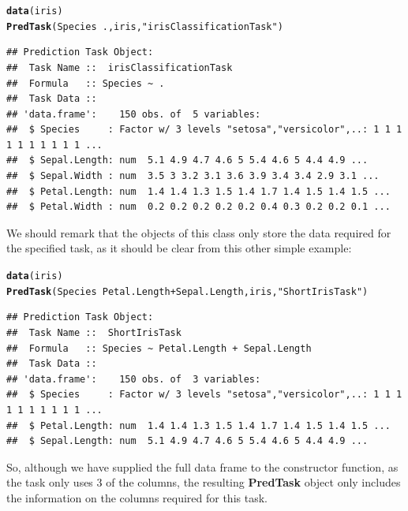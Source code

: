 \documentclass[10pt,a4paper]{article}\usepackage[]{graphicx}\usepackage[]{color}
\makeatletter
\newcommand{\hlstr}[1]{\textcolor[rgb]{0.192,0.494,0.8}{#1}}%
\newcommand{\hlopt}[1]{\textcolor[rgb]{0,0,0}{#1}}%
\newcommand{\hlstd}[1]{\textcolor[rgb]{0.345,0.345,0.345}{#1}}%
\newcommand{\hlkwd}[1]{\textcolor[rgb]{0.737,0.353,0.396}{\textbf{#1}}}%
\newenvironment{kframe}{%
 \def\at@end@of@kframe{}%
 \ifinner\ifhmode%
  \def\at@end@of@kframe{\end{minipage}}%
  \begin{minipage}{\columnwidth}%
 \fi\fi%
 \def\FrameCommand##1{\hskip\@totalleftmargin \hskip-\fboxsep
 \colorbox{shadecolor}{##1}\hskip-\fboxsep
     \hskip-\linewidth \hskip-\@totalleftmargin \hskip\columnwidth}%
 \MakeFramed {\advance\hsize-\width
   \@totalleftmargin\z@ \linewidth\hsize
   \@setminipage}}%
 {\par\unskip\endMakeFramed%
 \at@end@of@kframe}
\newenvironment{knitrout}{}{} %
\makeatother
\begin{document}
\begin{knitrout}
\color{fgcolor}\begin{kframe}
\begin{alltt}
\hlkwd{data}\hlstd{(iris)}
\hlkwd{PredTask}\hlstd{(Species} \hlopt{~} \hlstd{., iris,} \hlstr{"irisClassificationTask"}\hlstd{)}
\end{alltt}
\begin{verbatim}
## Prediction Task Object:
## 	Task Name ::  irisClassificationTask
## 	Formula   :: Species ~ .
## 	Task Data ::
## 'data.frame':	150 obs. of  5 variables:
##  $ Species     : Factor w/ 3 levels "setosa","versicolor",..: 1 1 1 1 1 1 1 1 1 1 ...
##  $ Sepal.Length: num  5.1 4.9 4.7 4.6 5 5.4 4.6 5 4.4 4.9 ...
##  $ Sepal.Width : num  3.5 3 3.2 3.1 3.6 3.9 3.4 3.4 2.9 3.1 ...
##  $ Petal.Length: num  1.4 1.4 1.3 1.5 1.4 1.7 1.4 1.5 1.4 1.5 ...
##  $ Petal.Width : num  0.2 0.2 0.2 0.2 0.2 0.4 0.3 0.2 0.2 0.1 ...
\end{verbatim}
\end{kframe}
\end{knitrout}


We should remark that the objects of this class only store the data
required for the specified task, as it should be clear from this other
simple example:

\begin{knitrout}
\color{fgcolor}\begin{kframe}
\begin{alltt}
\hlkwd{data}\hlstd{(iris)}
\hlkwd{PredTask}\hlstd{(Species} \hlopt{~} \hlstd{Petal.Length} \hlopt{+} \hlstd{Sepal.Length, iris,} \hlstr{"ShortIrisTask"}\hlstd{)}
\end{alltt}
\begin{verbatim}
## Prediction Task Object:
## 	Task Name ::  ShortIrisTask
## 	Formula   :: Species ~ Petal.Length + Sepal.Length
## 	Task Data ::
## 'data.frame':	150 obs. of  3 variables:
##  $ Species     : Factor w/ 3 levels "setosa","versicolor",..: 1 1 1 1 1 1 1 1 1 1 ...
##  $ Petal.Length: num  1.4 1.4 1.3 1.5 1.4 1.7 1.4 1.5 1.4 1.5 ...
##  $ Sepal.Length: num  5.1 4.9 4.7 4.6 5 5.4 4.6 5 4.4 4.9 ...
\end{verbatim}
\end{kframe}
\end{knitrout}


So, although we have supplied the full data frame to the constructor
function, as the task only uses 3 of the columns, the resulting
\textbf{PredTask} object only includes the information on the columns
required for this task.
\end{document}
